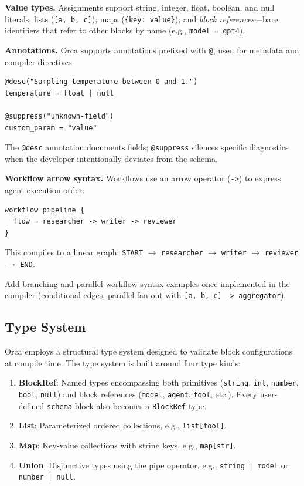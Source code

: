 \documentclass[sigconf,nonacm]{acmart}
\begin{document}
\noindent\textbf{Value types.} Assignments support string, integer, float,
boolean, and null literals; lists (\texttt{[a, b, c]}); maps
(\texttt{\{key: value\}}); and \emph{block references}---bare identifiers
that refer to other blocks by name (e.g., \texttt{model = gpt4}).

\noindent\textbf{Annotations.} Orca supports annotations prefixed with
\texttt{@}, used for metadata and compiler directives:

\begin{lstlisting}
@desc("Sampling temperature between 0 and 1.")
temperature = float | null

@suppress("unknown-field")
custom_param = "value"
\end{lstlisting}

The \texttt{@desc} annotation documents fields; \texttt{@suppress}
silences specific diagnostics when the developer intentionally deviates
from the schema.

\noindent\textbf{Workflow arrow syntax.} Workflows use an arrow operator
(\texttt{->}) to express agent execution order:

\begin{lstlisting}
workflow pipeline {
  flow = researcher -> writer -> reviewer
}
\end{lstlisting}

This compiles to a linear graph:
\texttt{START} $\rightarrow$ \texttt{researcher} $\rightarrow$
\texttt{writer} $\rightarrow$ \texttt{reviewer} $\rightarrow$ \texttt{END}.

\begin{todobox}
Add branching and parallel workflow syntax examples once implemented
in the compiler (conditional edges, parallel fan-out with
\texttt{[a, b, c] -> aggregator}).
\end{todobox}

\subsection{Type System}
\label{sec:language:types}

Orca employs a structural type system designed to validate block
configurations at compile time. The type system is built around four
type kinds:

\begin{enumerate}[leftmargin=*]
  \item \textbf{BlockRef}: Named types encompassing both primitives
        (\texttt{string}, \texttt{int}, \texttt{number}, \texttt{bool},
        \texttt{null}) and block references (\texttt{model}, \texttt{agent},
        \texttt{tool}, etc.). Every user-defined \texttt{schema} block
        also becomes a \texttt{BlockRef} type.
  \item \textbf{List}: Parameterized ordered collections, e.g.,
        \texttt{list[tool]}.
  \item \textbf{Map}: Key-value collections with string keys, e.g.,
        \texttt{map[str]}.
  \item \textbf{Union}: Disjunctive types using the pipe operator, e.g.,
        \texttt{string | model} or \texttt{number | null}.
\end{enumerate}
\end{document}
